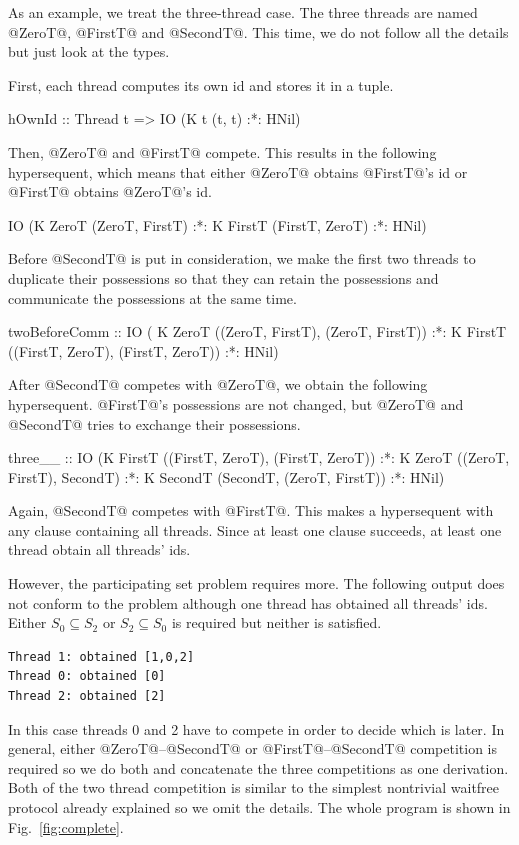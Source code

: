 \documentclass[doctor]{iscs-thesis}
\begin{document}
As an example, we treat the three-thread case.  The three threads are
named @ZeroT@, @FirstT@ and @SecondT@.
This time, we do not follow all the details but just look at the types.

First, each thread computes its own id and stores it in a tuple.
\begin{spec}
hOwnId :: Thread t => IO (K t (t, t) :*: HNil)
\end{spec}
Then, @ZeroT@ and @FirstT@ compete.  This results in the
following hypersequent, which means that either @ZeroT@ obtains
@FirstT@'s id or @FirstT@ obtains @ZeroT@'s id.
\begin{spec}
IO (K ZeroT (ZeroT, FirstT) :*:
    K FirstT (FirstT, ZeroT) :*: HNil)
\end{spec}

Before @SecondT@ is put in consideration, we make the first two threads
to duplicate their possessions so that they can retain the possessions
and communicate the possessions at the same time.
\begin{spec}
twoBeforeComm :: IO (
                        K ZeroT ((ZeroT, FirstT), (ZeroT, FirstT)) :*:
                        K FirstT ((FirstT, ZeroT), (FirstT, ZeroT)) :*:
                        HNil)
\end{spec}

After @SecondT@ competes with @ZeroT@, we obtain the following
hypersequent.  @FirstT@'s possessions are not changed, but @ZeroT@ and
@SecondT@ tries to exchange their possessions.
\begin{spec}
three__ :: IO
  (K FirstT ((FirstT, ZeroT), (FirstT, ZeroT)) :*:
   K ZeroT ((ZeroT, FirstT), SecondT) :*:
   K SecondT (SecondT, (ZeroT, FirstT)) :*: HNil)
\end{spec}
Again, @SecondT@ competes with @FirstT@.  This makes a hypersequent with
any clause containing all threads.  Since at least one clause succeeds,
at least one thread obtain all threads' ids.

However, the participating set problem requires more.  The following
output does not conform to the problem although one thread has obtained
all threads' ids.  Either $S_0 \subseteq S_2$ or $S_2\subseteq S_0$ is
required but neither is satisfied.
\begin{verbatim}
Thread 1: obtained [1,0,2]
Thread 0: obtained [0]
Thread 2: obtained [2]
\end{verbatim}
In this case threads 0 and 2 have to compete in order to decide which
is later.  In general, either @ZeroT@--@SecondT@ or
@FirstT@--@SecondT@ competition is required so we do both and
concatenate the three competitions as one derivation.
Both of the two thread competition is similar to the simplest nontrivial
waitfree protocol already explained so we omit the details.  The whole
program is shown in Fig.~\ref{fig:complete}.
\end{document}
